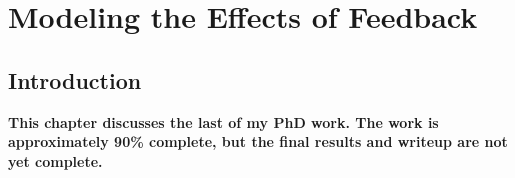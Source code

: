 \chapter{Modeling the Effects of Feedback}
\label{chapter:modeling}

\section{Introduction}
\textbf{\color{red} This chapter discusses the last of my PhD work.
    The work is approximately 90\% complete, but the final results and writeup are not yet complete.}




